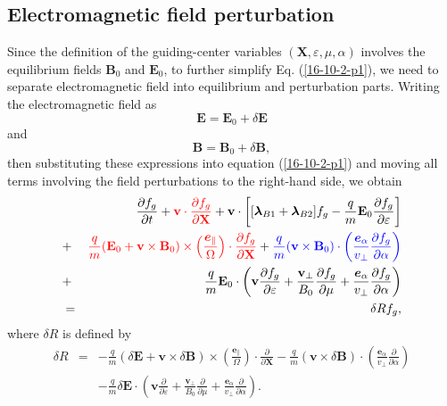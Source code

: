 \documentclass{llncs}
\newcommand{\tmcolor}[2]{{\color{#1}{#2}}}
\newcommand{\tmmathbf}[1]{\ensuremath{\boldsymbol{#1}}}
\begin{document}
\subsection{Electromagnetic field perturbation}

Since the definition of the guiding-center variables $(\mathbf{X},
\varepsilon, \mu, \alpha)$ involves the equilibrium fields $\mathbf{B}_0$ and
$\mathbf{E}_0$, to further simplify Eq. (\ref{16-10-2-p1}), we need to
separate electromagnetic field into equilibrium and perturbation parts.
Writing the electromagnetic field as
\begin{equation}
  \label{16-10-27-1} \mathbf{E}=\mathbf{E}_0 + \delta \mathbf{E}
\end{equation}
and
\begin{equation}
  \label{16-10-27-2} \mathbf{B}=\mathbf{B}_0 + \delta \mathbf{B},
\end{equation}
then substituting these expressions into equation (\ref{16-10-2-p1}) and
moving all terms involving the field perturbations to the right-hand side, we
obtain
\begin{eqnarray}
  &  & \frac{\partial f_g}{\partial t} + \tmcolor{red}{\mathbf{v} \cdot
  \frac{\partial f_g}{\partial \mathbf{X}}} +\mathbf{v} \cdot \left[
  [\tmmathbf{\lambda}_{B 1} +\tmmathbf{\lambda}_{B 2}] f_g - \frac{q}{m}
  \mathbf{E}_0 \frac{\partial f_g}{\partial \varepsilon} \right] \nonumber\\
  & + & \tmcolor{red}{\frac{q}{m} (\mathbf{E}_0 +\mathbf{v} \times
  \mathbf{B}_0) \times \left( \frac{\tmmathbf{e}_{\parallel}}{\Omega}  \right)
  \cdot \frac{\partial f_g}{\partial \mathbf{X}}} + \tmcolor{blue}{\frac{q}{m}
  (\mathbf{v} \times \mathbf{B}_0) \cdot \left(
  \frac{\tmmathbf{e}_{\alpha}}{v_{\perp}}  \frac{\partial f_g}{\partial
  \alpha} \right)} \nonumber\\
  & + & \frac{q}{m} \mathbf{E}_0 \cdot \left( \mathbf{v} \frac{\partial
  f_g}{\partial \varepsilon} + \frac{\mathbf{v}_{\perp}}{B_0}  \frac{\partial
  f_g}{\partial \mu} + \frac{\tmmathbf{e}_{\alpha}}{v_{\perp}}  \frac{\partial
  f_g}{\partial \alpha} \right) \nonumber\\
  & = & \delta R f_g,  \label{16-10-2-p2}
\end{eqnarray}
where $\delta R$ is defined by
\begin{eqnarray}
  \delta R & = & - \frac{q}{m} (\delta \mathbf{E}+\mathbf{v} \times \delta
  \mathbf{B}) \times \left( \frac{\tmmathbf{e}_{\parallel}}{\Omega}  \right)
  \cdot \frac{\partial}{\partial \mathbf{X}} - \frac{q}{m} (\mathbf{v} \times
  \delta \mathbf{B}) \cdot \left( \frac{\tmmathbf{e}_{\alpha}}{v_{\perp}} 
  \frac{\partial}{\partial \alpha} \right) \nonumber\\
  &  & - \frac{q}{m} \delta \mathbf{E} \cdot \left( \mathbf{v}
  \frac{\partial}{\partial \varepsilon} + \frac{\mathbf{v}_{\perp}}{B_0} 
  \frac{\partial}{\partial \mu} + \frac{\tmmathbf{e}_{\alpha}}{v_{\perp}} 
  \frac{\partial}{\partial \alpha} \right) .  \label{16-10-6-1}
\end{eqnarray}
\end{document}
